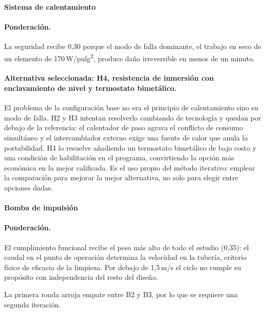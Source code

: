 \paragraph{Sistema de calentamiento}



\paragraph{Ponderación.} La seguridad recibe 0,30 porque el modo de falla dominante, el trabajo en seco de un elemento de 170\,W/pulg\textsuperscript{2}, produce daño irreversible en menos de un minuto.

\paragraph{Alternativa seleccionada: H4, resistencia de inmersión con enclavamiento de nivel y termostato bimetálico.} El problema de la configuración base no era el principio de calentamiento sino su modo de falla. H2 y H3 intentan resolverlo cambiando de tecnología y quedan por debajo de la referencia: el calentador de paso agrava el conflicto de consumo simultáneo y el intercambiador externo exige una fuente de calor que anula la portabilidad. H4 lo resuelve añadiendo un termostato bimetálico de bajo costo y una condición de habilitación en el programa, convirtiendo la opción más económica en la mejor calificada. Es el uso propio del método iterativo: emplear la comparación para mejorar la mejor alternativa, no solo para elegir entre opciones dadas.

\paragraph{Bomba de impulsión}



\paragraph{Ponderación.} El cumplimiento funcional recibe el peso más alto de todo el estudio (0,35): el caudal en el punto de operación determina la velocidad en la tubería, criterio físico de eficacia de la limpieza. Por debajo de 1,5\,m/s el ciclo no cumple su propósito con independencia del resto del diseño.

La primera ronda arroja empate entre B2 y B3, por lo que se requiere una segunda iteración.

